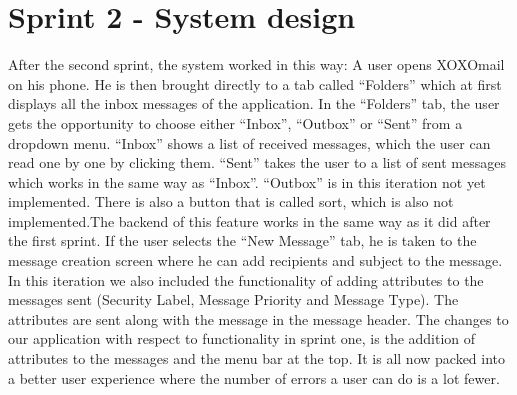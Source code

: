 \section{Sprint 2 - System design}
After the second sprint, the system worked in this way: A user opens XOXOmail on his phone. He is then brought directly to a tab called “Folders” which at first displays all the inbox messages of the application.
\newline
\newline
In the “Folders” tab, the user gets the opportunity to choose either “Inbox”, “Outbox” or “Sent” from a dropdown menu. “Inbox” shows a list of received messages, which the user can read one by one by clicking them. “Sent” takes the user to a list of sent messages which works in the same way as “Inbox”. “Outbox” is in this iteration not yet implemented. There is also a button that is called sort, which is also not implemented.The backend of this feature works in the same way as it did after the first sprint. 
\newline
\newline
If the user selects the “New Message” tab, he is taken to the message creation screen where he can add recipients and subject to the message. In this iteration we also included the functionality of adding attributes to the messages sent (Security Label, Message Priority and Message Type). The attributes are sent along with the message in the message header.
\newline
\newline
The changes to our application with respect to functionality in sprint one, is the addition of attributes to the messages and the menu bar at the top. It is all now packed into a better user experience where the number of errors a user can do is a lot fewer. 
